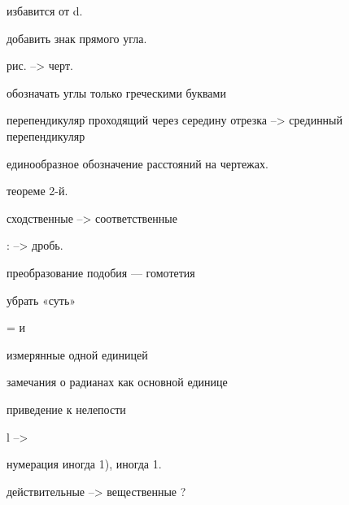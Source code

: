 




избавится от d.

добавить знак прямого угла.

рис. --> черт.

обозначать углы только греческими буквами

перепендикуляр проходящий через середину отрезка --> срединный перепендикуляр

единообразное обозначение расстояний на чертежах.

теореме 2-й.

сходственные --> соответственные

: --> дробь.

преобразование подобия --- гомотетия

убрать «суть»

= и \approx

измерянные одной единицей

замечания о радианах как основной единице

приведение к нелепости

l --> \ell

нумерация иногда 1), иногда 1.

действительные --> вещественные ?